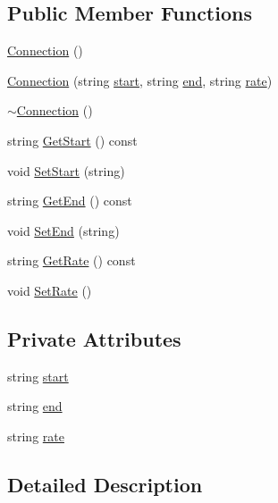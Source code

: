 \subsection*{Public Member Functions}
\begin{DoxyCompactItemize}
\item 
\hyperlink{classConnection_a9de94289ca6259f94ef6aeba3b134a77}{Connection} ()
\item 
\hyperlink{classConnection_ac63ae68b23cc60e56a5372f5d476d6b8}{Connection} (string \hyperlink{classConnection_a761d4f36c835443547758ee987454b4b}{start}, string \hyperlink{classConnection_aab791cc1d72139f7fce17ded6541037b}{end}, string \hyperlink{classConnection_a4169fd6525a547fa2fa238c58cf77dfe}{rate})
\item 
\hyperlink{classConnection_a2e4352edf667bea83001569e9da8a24d}{$\sim$Connection} ()
\item 
string \hyperlink{classConnection_adf469bc4ab33d4f426b39d2cf7d26b88}{GetStart} () const 
\item 
void \hyperlink{classConnection_acf6889ab6dc527abdc23a5d1aec8da49}{SetStart} (string)
\item 
string \hyperlink{classConnection_aab13bbdd6b7ada1d813d9ce7b3853a0b}{GetEnd} () const 
\item 
void \hyperlink{classConnection_a212339fd2842ca43b1bb4e53c0b5424e}{SetEnd} (string)
\item 
string \hyperlink{classConnection_a7551f3e3962a38598385e3ba57b5043f}{GetRate} () const 
\item 
void \hyperlink{classConnection_a402c8a961f2165fbcadc16ee9356d705}{SetRate} ()
\end{DoxyCompactItemize}
\subsection*{Private Attributes}
\begin{DoxyCompactItemize}
\item 
string \hyperlink{classConnection_a761d4f36c835443547758ee987454b4b}{start}
\item 
string \hyperlink{classConnection_aab791cc1d72139f7fce17ded6541037b}{end}
\item 
string \hyperlink{classConnection_a4169fd6525a547fa2fa238c58cf77dfe}{rate}
\end{DoxyCompactItemize}


\subsection{Detailed Description}


